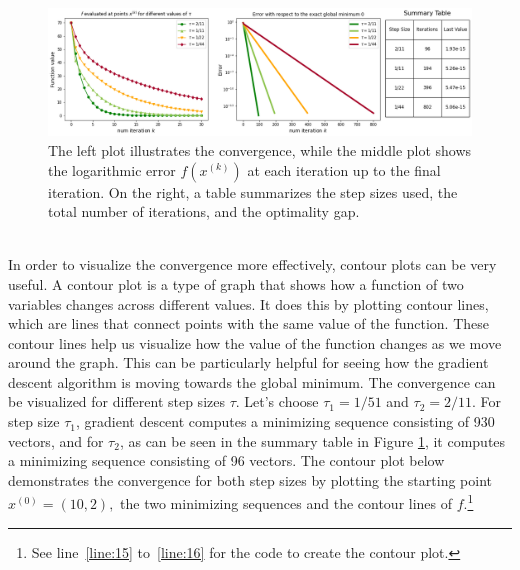 \begin{figure}[h!]
    \centering
        \includegraphics[width=1\textwidth]{Pictures/Merged_conv_ellipsoid_fixed_table.png}
    \caption{The left plot illustrates the convergence, while the middle plot shows the logarithmic error $f(x^{(k)})$ at each iteration up to the final iteration. On the right, a table summarizes the step sizes used, the total number of iterations, and the optimality gap.}\label{fig:convergence1_fixed}
\end{figure}\\
In order to visualize the convergence more effectively, contour plots can be very useful. A contour plot is a type of graph that shows how a function of two variables changes across different values. It does this by plotting contour lines, which are lines that connect points with the same value of the function. These contour lines help us visualize how the value of the function changes as we move around the graph. This can be particularly helpful for seeing how the gradient descent algorithm is moving towards the global minimum.
\newpage
The convergence can be visualized for different step sizes $\tau$. Let's choose $\tau_1 = 1/51$ and $\tau_2 = 2/11$. For step size $\tau_1$, gradient descent computes a minimizing sequence consisting of 930 vectors, and for $\tau_2$, as can be seen in the summary table in Figure \ref{fig:convergence1_fixed}, it computes a minimizing sequence consisting of 96 vectors. The contour plot below demonstrates the convergence for both step sizes by plotting the starting point $x^{(0)}=(10, 2),$ the two minimizing sequences and the contour lines of $f.$\footnote{See line~\ref{line:15} to~\ref{line:16} for the code to create the contour plot.}
